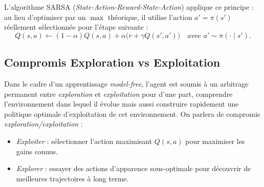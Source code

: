 L'algorithme SARSA (\emph{State-Action-Reward-State-Action}) applique ce principe : au lieu d'optimiser par un $\max$ théorique, il utilise l'action $a' = \pi(s')$ réellement sélectionnée pour l'étape suivante :
\begin{equation}
    Q(s, a) \longleftarrow (1 - \alpha) Q(s, a) + \alpha \Big( r + \gamma Q(s', a') \Big) \quad \text{avec } a' \sim \pi(\cdot \mid s').
\end{equation}

\subsection{Compromis Exploration vs Exploitation}

Dans le cadre d'un apprentissage \emph{model-free}, l'agent est soumis à un arbitrage permanent entre \emph{exploration} et \emph{exploitation} pour d'une part, comprendre l'environnement dans lequel il évolue mais aussi construire rapidement une politique optimale d'exploitation de cet environnement. On parlera de compromis \emph{exploration/exploitation} : 
\begin{itemize}
    \item \emph{Exploiter} : sélectionner l'action maximisant $Q(s, a)$ pour maximiser les gains connus.
    \item \emph{Explorer} : essayer des actions d'apparence sous-optimale pour découvrir de meilleures trajectoires à long terme.
\end{itemize}

